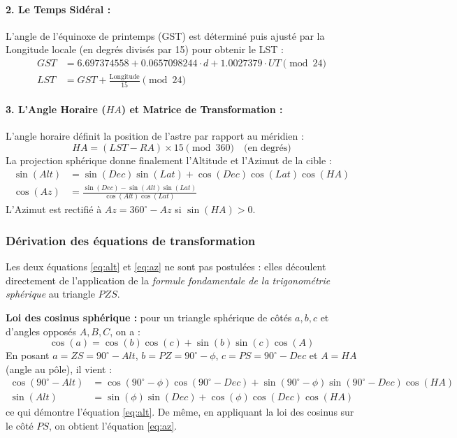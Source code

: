 \documentclass[12pt,a4paper]{report}
\begin{document}
\begin{enumerate}
\paragraph{2. Le Temps Sidéral :}
L'angle de l'équinoxe de printemps (GST) est déterminé puis ajusté par la Longitude locale (en degrés divisés par 15) pour obtenir le LST :
\begin{align}
    GST &= 6.697374558 + 0.0657098244 \cdot d + 1.0027379 \cdot UT \pmod{24} \\
    LST &= GST + \frac{\text{Longitude}}{15} \pmod{24}
\end{align}

\paragraph{3. L'Angle Horaire ($HA$) et Matrice de Transformation :}
L'angle horaire définit la position de l'astre par rapport au méridien :
\begin{equation}
    HA = (LST - RA) \times 15 \pmod{360} \quad \text{(en degrés)}
\end{equation}
La projection sphérique donne finalement l'Altitude et l'Azimut de la cible :
\begin{align}
    \sin(Alt) &= \sin(Dec)\sin(Lat) + \cos(Dec)\cos(Lat)\cos(HA) \label{eq:alt} \\
    \cos(Az) &= \frac{\sin(Dec) - \sin(Alt)\sin(Lat)}{\cos(Alt)\cos(Lat)} \label{eq:az}
\end{align}
L'Azimut est rectifié à $Az = 360^\circ - Az$ si $\sin(HA) > 0$.

\subsubsection{Dérivation des équations de transformation}
Les deux équations \eqref{eq:alt} et \eqref{eq:az} ne sont pas postulées : elles découlent directement de l'application de la \textit{formule fondamentale de la trigonométrie sphérique} au triangle $PZS$.

\textbf{Loi des cosinus sphérique :} pour un triangle sphérique de côtés $a, b, c$ et d'angles opposés $A, B, C$, on a :
\begin{equation}
    \cos(a) = \cos(b)\cos(c) + \sin(b)\sin(c)\cos(A)
\end{equation}
En posant $a = ZS = 90^\circ - Alt$, $b = PZ = 90^\circ - \phi$, $c = PS = 90^\circ - Dec$ et $A = HA$ (angle au pôle), il vient :
\begin{align}
    \cos(90^\circ - Alt) &= \cos(90^\circ - \phi)\cos(90^\circ - Dec) + \sin(90^\circ - \phi)\sin(90^\circ - Dec)\cos(HA) \\
    \sin(Alt) &= \sin(\phi)\sin(Dec) + \cos(\phi)\cos(Dec)\cos(HA)
\end{align}
ce qui démontre l'équation \eqref{eq:alt}. De même, en appliquant la loi des cosinus sur le côté $PS$, on obtient l'équation \eqref{eq:az}.


\end{enumerate}
\end{document}
